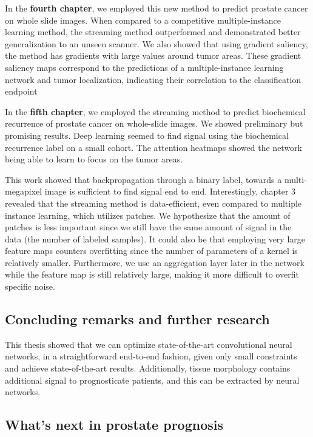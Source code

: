 \documentclass[
  12pt,
  a5,margin=2cmpaper,
]{article}
\begin{document}
In the \textbf{fourth chapter}, we employed this new method to predict
prostate cancer on whole slide images. When compared to a competitive
multiple-instance learning method, the streaming method outperformed and
demonstrated better generalization to an unseen scanner. We also showed
that using gradient saliency, the method has gradients with large values
around tumor areas. These gradient saliency maps correspond to the
predictions of a multiple-instance learning network and tumor
localization, indicating their correlation to the classification
endpoint

In the \textbf{fifth chapter}, we employed the streaming method to
predict biochemical recurrence of prostate cancer on whole-slide images.
We showed preliminary but promising results. Deep learning seemed to
find signal using the biochemical recurrence label on a small cohort.
The attention heatmaps showed the network being able to learn to focus
on the tumor areas.

This work showed that backpropagation through a binary label, towards a
multi-megapixel image is sufficient to find signal end to end.
Interestingly, chapter 3 revealed that the streaming method is
data-efficient, even compared to multiple instance learning, which
utilizes patches. We hypothesize that the amount of patches is less
important since we still have the same amount of signal in the data (the
number of labeled samples). It could also be that employing very large
feature maps counters overfitting since the number of parameters of a
kernel is relatively smaller. Furthermore, we use an aggregation layer
later in the network while the feature map is still relatively large,
making it more difficult to overfit specific noise.

\hypertarget{concluding-remarks-and-further-research}{%
\subsection{Concluding remarks and further
research}\label{concluding-remarks-and-further-research}}

This thesis showed that we can optimize state-of-the-art convolutional
neural networks, in a straightforward end-to-end fashion, given only
small constraints and achieve state-of-the-art results. Additionally,
tissue morphology contains additional signal to prognosticate patients,
and this can be extracted by neural networks.

\hypertarget{whats-next-in-prostate-prognosis}{%
\subsection{What's next in prostate
prognosis}\label{whats-next-in-prostate-prognosis}}
\end{document}
